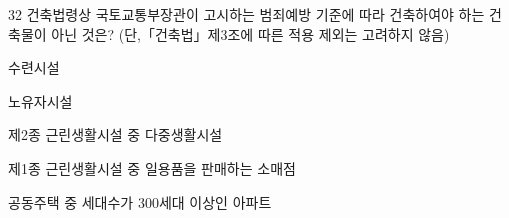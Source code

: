 \begin{question}{32}
건축법령상 국토교통부장관이 고시하는 범죄예방 기준에 따라 건축하여야 하는 건축물이 아닌 것은? (단,「건축법」제3조에 따른 적용 제외는 고려하지 않음)
\begin{choices}
  \item 수련시설
  \item 노유자시설
  \item 제2종 근린생활시설 중 다중생활시설
  \item 제1종 근린생활시설 중 일용품을 판매하는 소매점
  \item 공동주택 중 세대수가 300세대 이상인 아파트
\end{choices}
\end{question}
